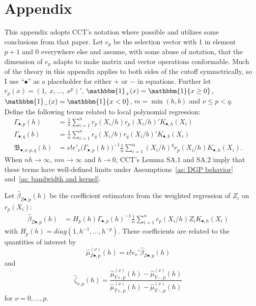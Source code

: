 \documentclass[12pt,]{article}
\DeclareMathOperator{\1}{\mathbbm{1}}
\newcommand{\Bf}{\mathfrak{B}}
\begin{document}
\appendix
\section{Appendix}
This appendix adopts CCT's notation where possible and utilizes some conclusions from that paper. Let $e_p$ be the selection vector with 1 in element $p+1$ and 0 everywhere else and assume, with some abuse of notation, that the dimension of $e_p$ adapts to make matrix and vector operations conformable. Much of the theory in this appendix applies to both sides of the cutoff symmetrically, so I use ``$\bullet$'' as a placeholder for either $+$ or $-$ in equations. Further let $r_p(x) = (1,\ x,\dots,\ x^p)'$, $\1_+(x) = \1\{x \geq 0\}$, $\1_-(x) = \1\{x < 0\}$, $m = \min(h, b)$ and $\nu \le p < q$. Define the following terms related to local polynomial regression:
\begin{align*}
\Gamma_{\bullet,p}(h)
&= \tfrac{1}{n} \sum_{i=1}^n r_p(X_i/h) r_p(X_i/h)' K_{\bullet,h}(X_i) \\
\Gamma_{\bullet,q}(b)
&= \tfrac{1}{n} \sum_{i=1}^n r_q(X_i/b) r_q(X_i/b)' K_{\bullet,b}(X_i) \\
\Bf_{\bullet, \nu, p, q}(h)
& = \nu ! e'_{\nu} \big(\Gamma_{\bullet,p}(h)\big)^{-1}
\tfrac{1}{n} \sum_{i=1}^n (X_i / h)^q r_p(X_i/h) K_{\bullet,h}(X_i).
\end{align*}
When $nh \to \infty$, $nm \to \infty$ and $h \to 0$, CCT's Lemma SA.1 and SA.2 imply that these terms have well-defined limits under Assumptions~\ref{as: DGP behavior} and~\ref{as: bandwidth and kernel}.

Let $\hat\beta_{Z \bullet,p}(h)$ be the coefficient estimators from the weighted regression of $Z_i$ on $r_p(X_i)$:
\begin{align*}
	\hat\beta_{Z \bullet,p}(h) &= H_p(h) \Gamma_{\bullet,p}(h)^{-1}
	\tfrac{1}{n} \sum_{i=1}^n r_p(X_i/h) Z_i K_{\bullet,h}(X_i)
\end{align*}
with $H_p(h) = diag(1, h^{-1}, \dots, h^{-p})$. These coefficients are related to the quantities of interest by
\begin{equation*}
	\hat{\mu}_{Z \bullet,p}^{(\nu)}(h) = \nu! e_\nu' \hat\beta_{Z \bullet,p}(h)
\end{equation*}
and
\begin{equation*}
	\hat \zeta_{\nu, p}(h) =
	\frac{\hat{\mu}_{Y +,p}^{(\nu)}(h) - \hat{\mu}_{Y -,p}^{(\nu)}(h)}
	{\hat{\mu}_{T +,p}^{(\nu)}(h) - \hat{\mu}_{T -,p}^{(\nu)}(h)}
\end{equation*}
for $\nu = 0,\dots,p$.
\end{document}
